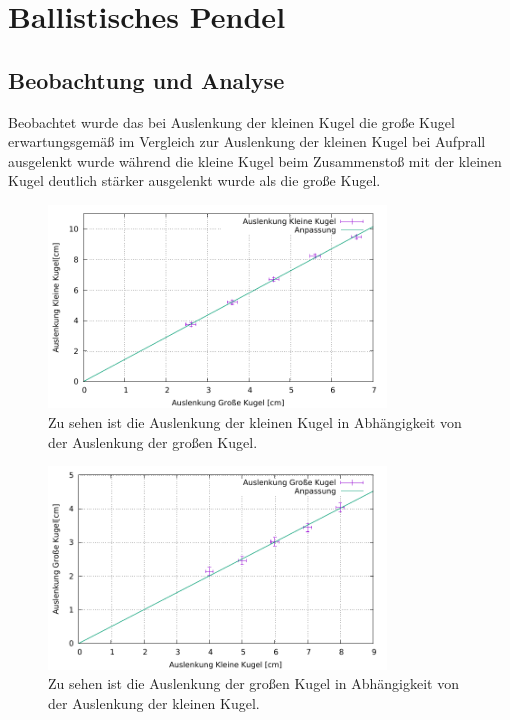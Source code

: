 \section{Ballistisches Pendel}\label{kap:Bal}
\subsection*{Beobachtung und Analyse}
Beobachtet wurde das bei Auslenkung der kleinen Kugel die große Kugel erwartungsgemäß im Vergleich zur Auslenkung der kleinen Kugel bei Aufprall ausgelenkt wurde während die kleine Kugel beim Zusammenstoß mit der kleinen Kugel deutlich stärker ausgelenkt wurde als die große Kugel.

\begin{figure}[h]
	\centering
	\includegraphics[width=0.8\textwidth]{res/GrosKlein.pdf}
	\caption{Zu sehen ist die Auslenkung der kleinen Kugel in Abhängigkeit von der Auslenkung der großen Kugel.}
	\label{fig:grosklein}
\end{figure}
\begin{figure}[h]
	\centering
	\includegraphics[width=0.8\textwidth]{res/KleinGros.pdf}
	\caption{Zu sehen ist die Auslenkung der großen Kugel in Abhängigkeit von der Auslenkung der kleinen Kugel.}
	\label{fig:kleingros}
\end{figure}

